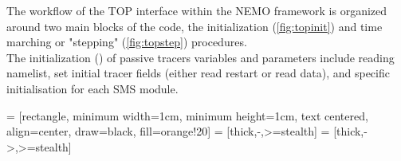 \documentclass[../main/TOP_manual]{subfiles}
\begin{document}
\pagebreak


The workflow of the TOP interface within the NEMO framework is organized around two main blocks of the code, the initialization (\autoref{fig:topinit}) and time marching or "stepping" (\autoref{fig:topstep}) procedures.\\

The initialization () of passive tracers variables and parameters include reading namelist, set initial tracer fields (either read restart or read data), and specific initialisation for each SMS module.

 = [rectangle, minimum width=1cm, minimum height=1cm, text centered,  align=center, draw=black, fill=orange!20]
 = [thick,-,>=stealth]
 = [thick,->,>=stealth]

\newcommand*{\connectorH}[2]{
  \draw[arrow] (#1) -- ++(1.cm,0) |-  (#2);
}
\end{document}
